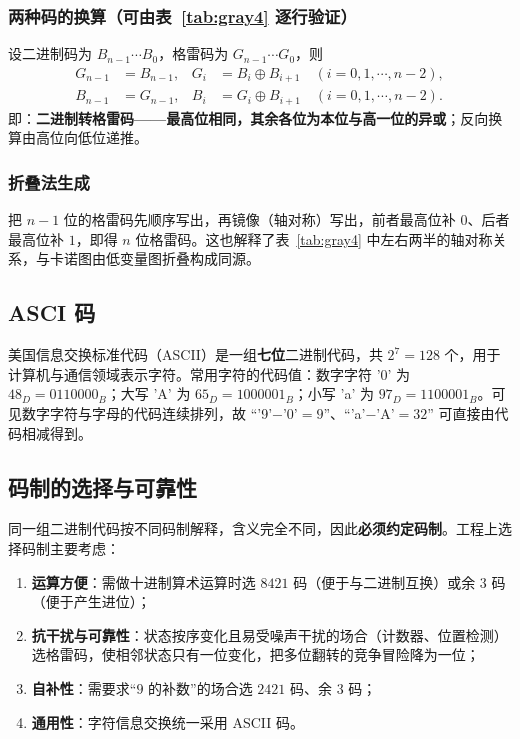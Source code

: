 \subsubsection{两种码的换算（可由表~\ref{tab:gray4} 逐行验证）}
设二进制码为 $B_{n-1}\cdots B_0$，格雷码为 $G_{n-1}\cdots G_0$，则
\begin{align}
G_{n-1}&=B_{n-1}, & G_{i}&=B_{i}\oplus B_{i+1}\quad(i=0,1,\cdots,n-2), \label{eq:bin2gray}\\
B_{n-1}&=G_{n-1}, & B_{i}&=G_{i}\oplus B_{i+1}\quad(i=0,1,\cdots,n-2). \label{eq:gray2bin}
\end{align}
即：\textbf{二进制转格雷码——最高位相同，其余各位为本位与高一位的异或}；反向换算由高位向低位递推。

\subsubsection{折叠法生成}
把 $n-1$ 位的格雷码先顺序写出，再镜像（轴对称）写出，前者最高位补 $0$、后者最高位补 $1$，即得 $n$ 位格雷码。这也解释了表~\ref{tab:gray4} 中左右两半的轴对称关系，与卡诺图由低变量图折叠构成同源。

\subsection{ASCI 码}
美国信息交换标准代码（ASCII）是一组\textbf{七位}二进制代码，共 $2^7=128$ 个，用于计算机与通信领域表示字符。常用字符的代码值：数字字符 '0' 为 $48_{D}=0110000_{B}$；大写 'A' 为 $65_{D}=1000001_{B}$；小写 'a' 为 $97_{D}=1100001_{B}$。可见数字字符与字母的代码连续排列，故 ``'9'$-$'0'$=9$''、``'a'$-$'A'$=32$'' 可直接由代码相减得到。

\subsection{码制的选择与可靠性}
同一组二进制代码按不同码制解释，含义完全不同，因此\textbf{必须约定码制}。工程上选择码制主要考虑：
\begin{enumerate}
    \item \textbf{运算方便}：需做十进制算术运算时选 $8421$ 码（便于与二进制互换）或余 $3$ 码（便于产生进位）；
    \item \textbf{抗干扰与可靠性}：状态按序变化且易受噪声干扰的场合（计数器、位置检测）选格雷码，使相邻状态只有一位变化，把多位翻转的竞争冒险降为一位；
    \item \textbf{自补性}：需要求``$9$ 的补数''的场合选 $2421$ 码、余 $3$ 码；
    \item \textbf{通用性}：字符信息交换统一采用 ASCII 码。
\end{enumerate}

